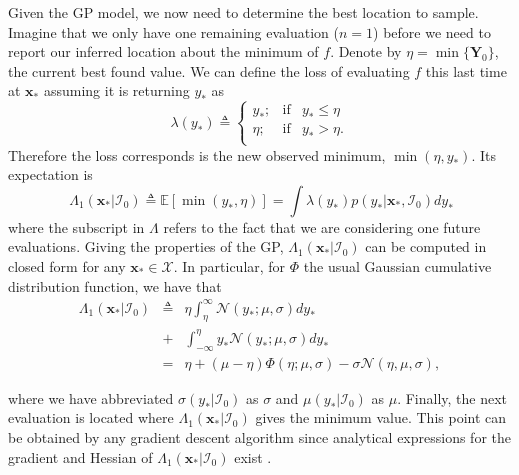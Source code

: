\documentclass[twoside]{article}
\newcommand{\I}{\mathcal{I}}
\newcommand{\E}{\mathbb{E}}
\newcommand{\bx}{\textbf{x}}
\newcommand{\bY}{\textbf{Y}}
\begin{document}
Given the GP model, we now need to determine the best location to sample. Imagine that we only have one remaining evaluation ($n=1$) before we need to report our inferred location about the minimum of $f$. Denote by $\eta = \min \{\bY_0\}$, the current best found value. We can define the loss of evaluating $f$ this last time at $\bx_*$ assuming it is returning $y_*$ as
$$\lambda(y_*)\triangleq \left\{ \begin{array}{lcl}
y_*;             & \mbox{if}  &  y_* \leq \eta \\
 \eta; & \mbox{if}  & y_* > \eta. \\
\end{array}
\right.$$
Therefore the loss corresponds is the new observed minimum, $\min (\eta,y_*)$. Its expectation is 
$$\ \Lambda_1(\bx_*| \I_0) \triangleq \E[ \min (y_*,\eta)]= \int \lambda(y_*)p(y_* |\bx_*,\I_0)dy_*$$
where the subscript in $\Lambda$ refers to the fact that we are considering one future evaluations.  Giving the properties of the GP, $\Lambda_1(\bx_*| \I_0)$ can be computed in closed form for any $\bx_* \in \mathcal{X}$. In particular, for $\Phi$ the usual Gaussian cumulative distribution function, we have that
\begin{eqnarray}\label{eq:expected_myopic_loss}
\Lambda_1(\bx_*| \I_0) &  \triangleq & \eta \int_{\eta}^{\infty} \mathcal{N}(y_*;\mu,\sigma) dy_* \\ \nonumber
& +  & \int_{-\infty}^{\eta} y_* \mathcal{N}(y_*;\mu,\sigma) dy_*  \\ \nonumber
& = &  \eta +(\mu  - \eta) \Phi (\eta ; \mu, \sigma) - \sigma \mathcal{N} (\eta, \mu, \sigma), \nonumber
\end{eqnarray}

where we have abbreviated $\sigma(y_*|\I_0)$ as $\sigma$ and $\mu(y_{*}|\I_0)$ as $\mu$. Finally, the next evaluation is located   where $\Lambda_1(\bx_*| \I_0) $ gives the minimum value. This point can  be obtained by any gradient descent algorithm since analytical expressions for the gradient and Hessian of $\Lambda_1(\bx_*| \I_0)$  exist \cite{osborne_bayesian_2010}. 




\end{document}
